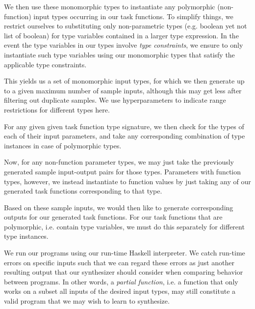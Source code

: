 \documentclass{article}
\begin{document}
We then use these monomorphic types to instantiate any polymorphic
(non-function) input types occurring in our task functions.
To simplify things, we restrict ourselves to substituting only non-parametric types (e.g. boolean yet not list of boolean) for type variables contained in a larger type expression.
In the event the type variables in our types involve \emph{type constraints},
we ensure to only instantiate such type variables using our monomorphic types that satisfy the applicable type constraints.

This yields us a set of monomorphic input types,
for which we then generate up to a given maximum number of sample inputs,
although this may get less after filtering out duplicate samples.
We use hyperparameters to indicate range restrictions for different types here.

For any given given task function type signature,
we then check for the types of each of their input parameters,
and take any corresponding combination of type instances in case of polymorphic types.

Now, for any non-function parameter types,
we may just take the previously generated sample input-output pairs for those types.
Parameters with function types, however,
we instead instantiate to function values by just taking
any of our generated task functions corresponding to that type.

Based on these sample inputs, we would then like to generate corresponding outputs for our generated task functions.
For our task functions that are polymorphic, i.e. contain type variables,
we must do this separately for different type instances.


We run our programs using our run-time Haskell interpreter.
We catch run-time errors on specific inputs such that
we can regard these errors as just another resulting output
that our synthesizer should consider when comparing behavior between programs.
In other words, a \emph{partial function},
i.e. a function that only works on a subset all inputs of the desired input types,
may still constitute a valid program that we may wish to learn to synthesize.
\end{document}
